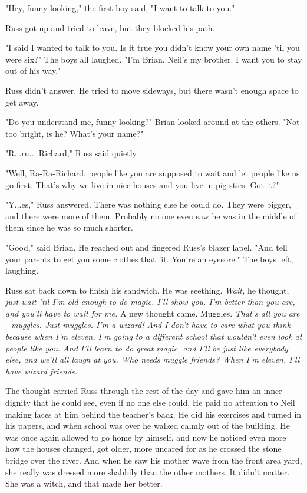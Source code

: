 \documentclass[a4paper,11pt]{article}
\begin{document}
"Hey, funny-looking," the first boy said, "I want to talk to you."

Russ got up and tried to leave, but they blocked his path.

"I said I wanted to talk to you. Is it true you didn't know your own name 'til you were six?" The boys all laughed. "I'm Brian. Neil's my brother. I want you to stay out of his way."

Russ didn't answer. He tried to move sideways, but there wasn't enough space to get away.

"Do you understand me, funny-looking?" Brian looked around at the others. "Not too bright, is he? What's your name?"

"R...ru... Richard," Russ said quietly.

"Well, Ra-Ra-Richard, people like you are supposed to wait and let people like us go first. That's why we live in nice houses and you live in pig sties. Got it?"

"Y...es," Russ answered. There was nothing else he could do. They were bigger, and there were more of them. Probably no one even saw he was in the middle of them since he was so much shorter.

"Good," said Brian. He reached out and fingered Russ's blazer lapel. "And tell your parents to get you some clothes that fit. You're an eyesore." The boys left, laughing.

Russ sat back down to finish his sandwich. He was seething. \emph{Wait,} he thought, \emph{just wait 'til I'm old enough to do magic. I'll show you. I'm better than you are, and you'll have to wait for me.} A new thought came. Muggles. \emph{That's all you are - muggles. Just muggles. I'm a wizard! And I don't have to care what you think because when I'm eleven, I'm going to a different school that wouldn't even look at people like you. And I'll learn to do great magic, and I'll be just like everybody else, and we'll all laugh at you. Who needs muggle friends? When I'm eleven, I'll have wizard friends.}

The thought carried Russ through the rest of the day and gave him an inner dignity that he could see, even if no one else could. He paid no attention to Neil making faces at him behind the teacher's back. He did his exercises and turned in his papers, and when school was over he walked calmly out of the building. He was once again allowed to go home by himself, and now he noticed even more how the houses changed, got older, more uncared for as he crossed the stone bridge over the river. And when he saw his mother wave from the front area yard, she really was dressed more shabbily than the other mothers. It didn't matter. She was a witch, and that made her better.
\end{document}
